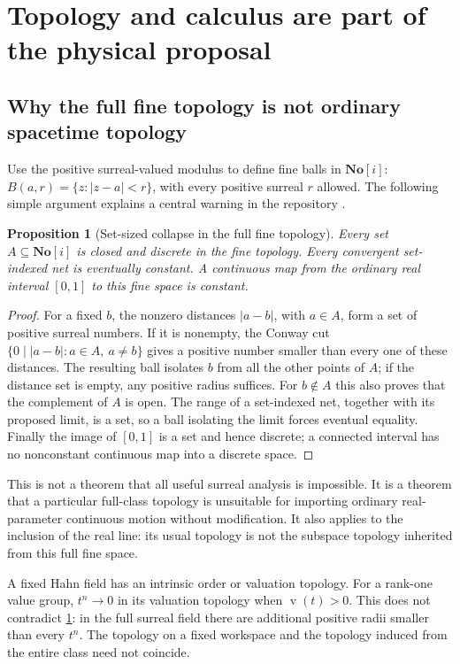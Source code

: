 \documentclass[11pt,a4paper]{article}
\numberwithin{equation}{section}
\newtheorem{proposition}[theorem]{Proposition}
\theoremstyle{definition}
\theoremstyle{remark}
\newcommand{\No}{\mathbf{No}}
\newcommand{\Sc}{\No[i]}
\newcommand{\val}{\operatorname{v}}
\begin{document}
\section{Topology and calculus are part of the physical proposal}\label{sec:calculus}

\subsection{Why the full fine topology is not ordinary spacetime topology}
Use the positive surreal-valued modulus to define fine balls in $\Sc$:
$B(a,r)=\{z:|z-a|<r\}$, with every positive surreal $r$ allowed. The following
simple argument explains a central warning in the repository
\cite{RepoAnalysis}.

\begin{proposition}[Set-sized collapse in the full fine topology]\label{prop:discrete}
Every set $A\subseteq\Sc$ is closed and discrete in the fine topology. Every
convergent set-indexed net is eventually constant. A continuous map from the
ordinary real interval $[0,1]$ to this fine space is constant.
\end{proposition}
\begin{proof}
For a fixed $b$, the nonzero distances $|a-b|$, with $a\in A$, form a set of
positive surreal numbers. If it is nonempty, the Conway cut
$\{0\mid |a-b|:a\in A,\ a\ne b\}$ gives a positive number smaller than every
one of these distances. The resulting ball isolates $b$ from all the other
points of $A$; if the distance set is empty, any positive radius suffices.
For $b\notin A$ this also proves that the complement of $A$ is open.
The range of a set-indexed net, together with its proposed limit, is a set, so a
ball isolating the limit forces eventual equality. Finally the image of
$[0,1]$ is a set and hence discrete; a connected interval has no nonconstant
continuous map into a discrete space.
\end{proof}

This is not a theorem that all useful surreal analysis is impossible. It is a
theorem that a particular full-class topology is unsuitable for importing
ordinary real-parameter continuous motion without modification. It also applies
to the inclusion of the real line: its usual topology is not the subspace
topology inherited from this full fine space.

A fixed Hahn field has an intrinsic order or valuation topology. For a rank-one
value group, $t^n\to0$ in its valuation topology when $\val(t)>0$. This does not
contradict \cref{prop:discrete}: in the full surreal field there are additional
positive radii smaller than every $t^n$. The topology on a fixed workspace and
the topology induced from the entire class need not coincide.
\end{document}
